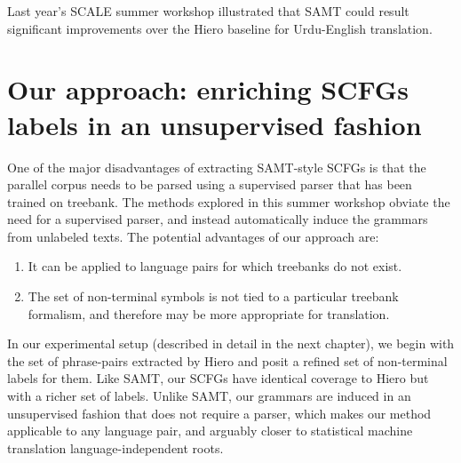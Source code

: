 Last year's SCALE summer workshop \cite{SCALE-report} illustrated that SAMT could result significant improvements over the Hiero baseline for  Urdu-English translation. 


\section{Our approach: enriching SCFGs labels in an unsupervised fashion}\label{sec:our-approach}

One of the major disadvantages of extracting SAMT-style SCFGs is that the parallel corpus needs to be parsed using a supervised parser that has been trained on treebank.   The methods explored in this summer workshop obviate the need for a supervised parser, and instead automatically induce the grammars from unlabeled texts.  The potential advantages of our approach are:
\begin{enumerate}
\item It can be applied to language pairs for which treebanks do not exist.
\item The set of non-terminal symbols is not tied to a particular treebank formalism, and therefore may be more appropriate for translation.
\end{enumerate} 
In our experimental setup (described in detail in the next chapter), we begin with the set of phrase-pairs extracted by  Hiero and posit a refined set of non-terminal labels for them.  Like SAMT, our SCFGs have identical coverage to Hiero but with a richer set of labels.    Unlike SAMT, our grammars are induced in an unsupervised fashion that does not require a parser, which makes our method applicable to any language pair, and arguably closer to statistical machine translation language-independent roots.

